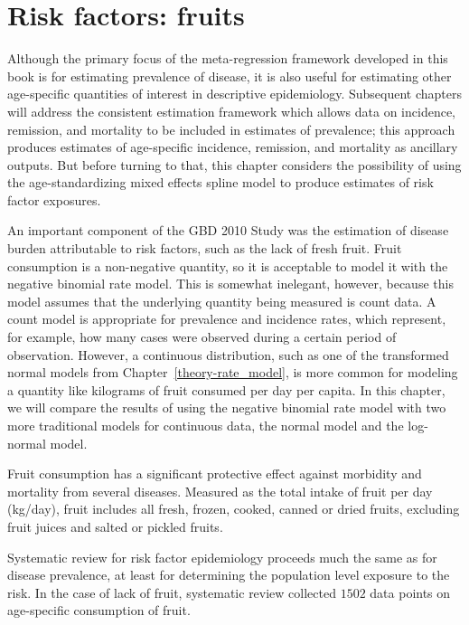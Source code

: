 \chapter{Risk factors: fruits}
\label{applications-log_normal}

Although the primary focus of the meta-regression framework developed
in this book is for estimating prevalence of disease, it is also
useful for estimating other age-specific quantities of interest in
descriptive epidemiology.  Subsequent chapters will address the
consistent estimation framework which allows data on incidence,
remission, and mortality to be included in estimates of prevalence;
this approach produces estimates of age-specific incidence, remission,
and mortality as ancillary outputs.  But before turning to that,
this chapter considers the possibility of using the
age-standardizing mixed effects spline model to produce estimates of
risk factor exposures.

An important component of the GBD 2010 Study was the estimation of
disease burden attributable to risk factors, such as the lack of fresh
fruit.  Fruit consumption is a non-negative quantity, so it is
acceptable to model it with the negative binomial rate model.  This is
somewhat inelegant, however, because this model assumes that the
underlying quantity being measured is count data.  A count model is
appropriate for prevalence and incidence rates, which represent, for
example, how many cases were observed during a certain period of
observation.  However, a continuous distribution, such as one of the
transformed normal models from Chapter~\ref{theory-rate_model}, is
more common for modeling a quantity like kilograms of fruit consumed
per day per capita.  In this chapter, we will compare the results of
using the negative binomial rate model with two more traditional
models for continuous data, the normal model and the log-normal model.

Fruit consumption has a significant protective
effect against morbidity and mortality from several diseases.
Measured as the total intake of fruit per day (kg/day), fruit
includes all fresh, frozen, cooked, canned or dried fruits, excluding
fruit juices and salted or pickled fruits. \cite{he_increased_2007,
  boeing_intake_2006}

Systematic review for
risk factor epidemiology proceeds much the same as for disease
prevalence, at least for determining the population level exposure to
the risk.  In the case of lack of fruit, systematic review collected
$1502$ data points on age-specific consumption of fruit.

